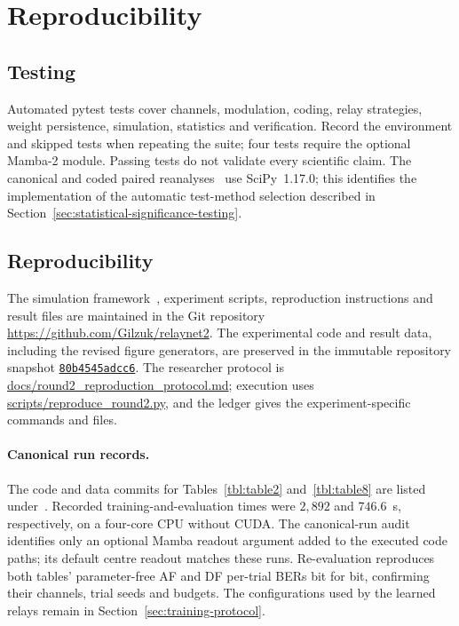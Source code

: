 \section{Reproducibility}\label{sec:appendix-c-software-architecture}

\subsection{Testing} Automated pytest tests cover channels, modulation, coding, relay strategies, weight persistence, simulation, statistics and verification. Record the environment and skipped tests when repeating the suite; four tests require the optional Mamba-2 module. Passing tests do not validate every scientific claim. The canonical and coded paired reanalyses~ use SciPy~1.17.0; this identifies the implementation of the automatic test-method selection described in Section~\ref{sec:statistical-significance-testing}.

\subsection{Reproducibility} The simulation framework~, experiment scripts, reproduction instructions and result files are maintained in the Git repository \url{https://github.com/Gilzuk/relaynet2}. The experimental code and result data, including the revised figure generators, are preserved in the immutable repository snapshot \href{https://github.com/Gilzuk/relaynet2/tree/80b4545adcc66e4be1f435364f7ec927e87f6414}{\texttt{80b4545adcc6}}. The researcher protocol is \url{docs/round2_reproduction_protocol.md}; execution uses \url{scripts/reproduce_round2.py}, and the ledger gives the experiment-specific commands and files.

\paragraph{Canonical run records.} The code and data commits for Tables~\ref{tbl:table2} and~\ref{tbl:table8} are listed under~. Recorded training-and-evaluation times were $2{,}892$ and $746.6$~s, respectively, on a four-core CPU without CUDA. The canonical-run audit~ identifies only an optional Mamba readout argument added to the executed code paths; its default centre readout matches these runs. Re-evaluation reproduces both tables' parameter-free AF and DF per-trial BERs bit for bit, confirming their channels, trial seeds and budgets. The configurations used by the learned relays remain in Section~\ref{sec:training-protocol}.

